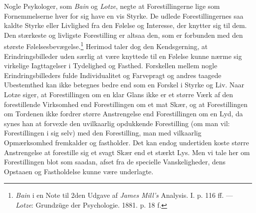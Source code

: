 \documentclass[12pt,a4paper,openany]{book}
\begin{document}
Nogle Psykologer, som \emph{Bain} og \emph{Lotze}, negte at
Forestillingerne lige som Fornemmelserne hver for sig have en vis
Styrke. De udlede Forestillingernes saa kaldte Styrke eller Livlighed
fra den Følelse og Interesse, der knytter sig til dem. Den stærkeste og
livligste Forestilling er altsaa den, som er forbunden med den største
Følelsesbevægelse.\footnote[1]{\emph{Bain} i en Note til 2den Udgave af
\emph{James Mill’s} Analysis. I. p. 116 ff. --- \emph{Lotze}: Grundzüge
der Psychologie. 1881. p. 18 f.} Herimod taler dog den Kendsgerning, at
Erindringsbilleder uden særlig at være knyttede til en Følelse kunne
nærme sig virkelige Iagttagelser i Tydelighed og Fasthed. Forskellen
mellem nogle Erindringsbilleders fulde Individualitet og Farvepragt og
andres taagede Ubestemthed kan ikke betegnes bedre end som en Forskel i
Styrke og Liv. Naar Lotze siger, at Forestillingen om en klar Glans ikke
er et større Værk af den forestillende Virksomhed end Forestillingen om
et mat Skær, og at Forestillingen om Tordenen ikke fordrer større
Anstrengelse end Forestillingen om en Lyd, da synes han at forvexle den
uvilkaarlig opdukkende Forestilling (om man vil: Forestillingen i sig
selv) med den Forestilling, man med vilkaarlig Opmærksomhed fremkalder
og fastholder. Det kan endog undertiden koste større Anstrengelse at
forestille sig et svagt Skær end et stærkt Lys. Men vi tale her om
Forestillingen blot som saadan, afset fra de specielle Vanskeligheder,
dens Opstaaen og Fastholdelse kunne være underlagte.
\end{document}
